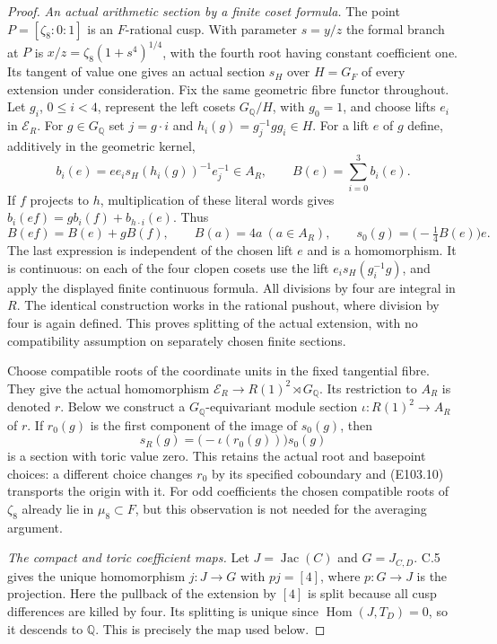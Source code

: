 \begin{proof}
\emph{An actual arithmetic section by a finite coset formula.}
The point $P=[\zeta _8:0:1]$ is an $F$-rational cusp.
With parameter $s=y/z$ the formal branch at $P$ is
$x/z=\zeta _8(1+s^4)^{1/4}$, with the fourth root having
constant coefficient one.  Its tangent of value one gives an
actual section $s_H$ over $H=G_F$ of every extension under
consideration.  Fix the same geometric fibre functor throughout.
Let $g_i$, $0\le i<4$, represent the left cosets $G_{\mathbb Q}/H$,
with $g_0=1$, and choose lifts $e_i$ in $\mathcal E_R$.
For $g\in G_{\mathbb Q}$ set
$j=g\cdot i$ and $h_i(g)=g_j^{-1}gg_i\in H$.
For a lift $e$ of $g$ define, additively in the geometric kernel,
\[
 b_i(e)=e e_i s_H(h_i(g))^{-1}e_j^{-1}\in A_R,
 \qquad B(e)=\sum_{i=0}^3b_i(e).
 \tag{E103.8}
\]
If $f$ projects to $h$, multiplication of these literal words gives
$b_i(ef)=g b_i(f)+b_{h\cdot i}(e)$.  Thus
\[
 B(ef)=B(e)+gB(f),\qquad B(a)=4a\ (a\in A_R),\qquad
 s_0(g)=\bigl(-\tfrac14B(e)\bigr)e.
 \tag{E103.9}
\]
The last expression is independent of the chosen lift $e$ and is
a homomorphism.  It is continuous: on each of the four clopen
cosets use the lift $e_i s_H(g_i^{-1}g)$, and apply the displayed
finite continuous formula.  All divisions by four are integral
in $R$.  The identical construction works in the rational
pushout, where division by four is again defined.
This proves splitting of the actual extension, with no
compatibility assumption on separately chosen finite sections.

Choose compatible roots of the coordinate units in the fixed
tangential fibre.  They give the actual homomorphism
$\mathcal E_R\to R(1)^2\rtimes G_{\mathbb Q}$.
Its restriction to $A_R$ is denoted $r$.
Below we construct a $G_{\mathbb Q}$-equivariant module section
$\iota:R(1)^2\to A_R$ of $r$.
If $r_0(g)$ is the first component of the image of $s_0(g)$, then
\[
 s_R(g)=\bigl(-\iota(r_0(g))\bigr)s_0(g)
 \tag{E103.10}
\]
is a section with toric value zero.  This retains the actual root
and basepoint choices: a different choice changes $r_0$ by its
specified coboundary and (E103.10) transports the origin with it.
For odd coefficients the chosen compatible roots of $\zeta _8$
already lie in $\mu _8\subset F$, but this observation is not
needed for the averaging argument.

\emph{The compact and toric coefficient maps.}
Let $J=\operatorname{Jac}(C)$ and $G=J_{C,D}$.
C.5 gives the unique homomorphism
$j:J\to G$ with $p j=[4]$, where $p:G\to J$ is the projection.
Here the pullback of the extension by $[4]$ is split because all
cusp differences are killed by four.  Its splitting is unique
since $\operatorname{Hom}(J,T_D)=0$, so it descends to
$\mathbb Q$.  This is precisely the map used below.


\end{proof}
